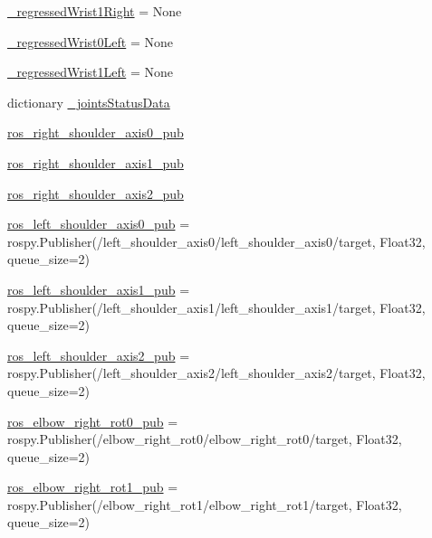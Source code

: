 \begin{DoxyCompactItemize}
\mbox{\hyperlink{namespacesteering__simulation_a39e4eb08bba548e27a24df3b40a96c48}{\+\_\+regressed\+Wrist1\+Right}} = None
\item 
\mbox{\hyperlink{namespacesteering__simulation_a99abea20d1f4b510dd4dfb589201b963}{\+\_\+regressed\+Wrist0\+Left}} = None
\item 
\mbox{\hyperlink{namespacesteering__simulation_aa295ffef98b1c03490f0cac204d3d7f1}{\+\_\+regressed\+Wrist1\+Left}} = None
\item 
dictionary \mbox{\hyperlink{namespacesteering__simulation_a151daa71bd805d2dd04fe522c1ddac4f}{\+\_\+joints\+Status\+Data}}
\item 
\mbox{\hyperlink{namespacesteering__simulation_a7824803c03df4637e22449c926522d6d}{ros\+\_\+right\+\_\+shoulder\+\_\+axis0\+\_\+pub}}
\item 
\mbox{\hyperlink{namespacesteering__simulation_a5da8818119a4289e3ed21573706ee4ad}{ros\+\_\+right\+\_\+shoulder\+\_\+axis1\+\_\+pub}}
\item 
\mbox{\hyperlink{namespacesteering__simulation_a70a5d7e7cbdd1a4af5ac27b114633b9d}{ros\+\_\+right\+\_\+shoulder\+\_\+axis2\+\_\+pub}}
\item 
\mbox{\hyperlink{namespacesteering__simulation_a0f7519e7fbc7a8cabdcdde1482ccacde}{ros\+\_\+left\+\_\+shoulder\+\_\+axis0\+\_\+pub}} = rospy.\+Publisher(\textquotesingle{}/left\+\_\+shoulder\+\_\+axis0/left\+\_\+shoulder\+\_\+axis0/target\textquotesingle{}, Float32, queue\+\_\+size=2)
\item 
\mbox{\hyperlink{namespacesteering__simulation_a75aaf98b6863a0aee4b61ee17b0133ba}{ros\+\_\+left\+\_\+shoulder\+\_\+axis1\+\_\+pub}} = rospy.\+Publisher(\textquotesingle{}/left\+\_\+shoulder\+\_\+axis1/left\+\_\+shoulder\+\_\+axis1/target\textquotesingle{}, Float32, queue\+\_\+size=2)
\item 
\mbox{\hyperlink{namespacesteering__simulation_af594d9d0bfdf575e6e26e0b6a3a53c8b}{ros\+\_\+left\+\_\+shoulder\+\_\+axis2\+\_\+pub}} = rospy.\+Publisher(\textquotesingle{}/left\+\_\+shoulder\+\_\+axis2/left\+\_\+shoulder\+\_\+axis2/target\textquotesingle{}, Float32, queue\+\_\+size=2)
\item 
\mbox{\hyperlink{namespacesteering__simulation_a3d22b5897eee35c841b1df82b5d02111}{ros\+\_\+elbow\+\_\+right\+\_\+rot0\+\_\+pub}} = rospy.\+Publisher(\textquotesingle{}/elbow\+\_\+right\+\_\+rot0/elbow\+\_\+right\+\_\+rot0/target\textquotesingle{}, Float32, queue\+\_\+size=2)
\item 
\mbox{\hyperlink{namespacesteering__simulation_a1280b460562790964403c7752bbc056d}{ros\+\_\+elbow\+\_\+right\+\_\+rot1\+\_\+pub}} = rospy.\+Publisher(\textquotesingle{}/elbow\+\_\+right\+\_\+rot1/elbow\+\_\+right\+\_\+rot1/target\textquotesingle{}, Float32, queue\+\_\+size=2)

\end{DoxyCompactItemize}
